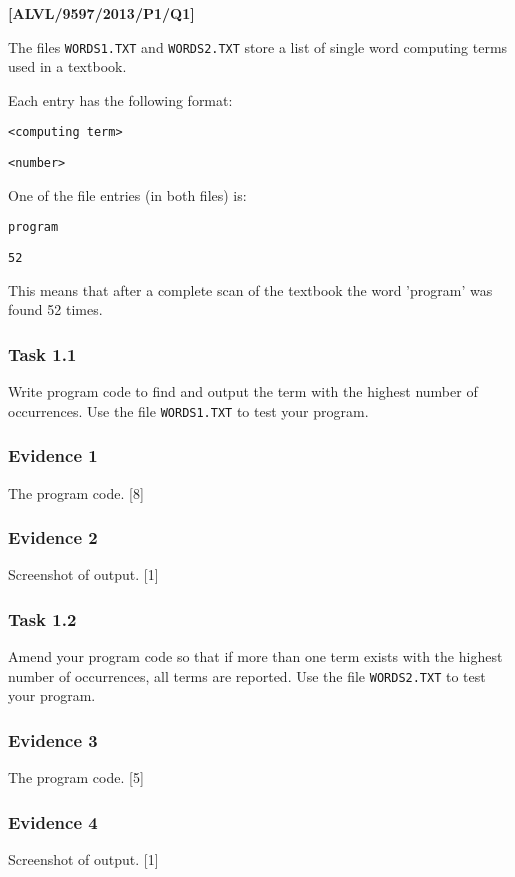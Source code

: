 \item \textbf{{[}ALVL/9597/2013/P1/Q1{]} }

The files \texttt{WORDS1.TXT} and \texttt{WORDS2.TXT} store a list
of single word computing terms used in a textbook.

Each entry has the following format: 

\texttt{<computing term>}

\texttt{<number>}

One of the file entries (in both files) is:

\texttt{program }

\texttt{52}

This means that after a complete scan of the textbook the word 'program'
was found 52 times.

\subsubsection*{Task 1.1}

Write program code to find and output the term with the highest number
of occurrences. Use the file \texttt{WORDS1.TXT} to test your program.

\subsubsection*{Evidence 1}

The program code. \hfill{}{[}8{]}

\subsubsection*{Evidence 2}

Screenshot of output. \hfill{}{[}1{]}

\subsubsection*{Task 1.2}

Amend your program code so that if more than one term exists with
the highest number of occurrences, all terms are reported. Use the
file \texttt{WORDS2.TXT} to test your program.

\subsubsection*{Evidence 3}

The program code. \hfill{}{[}5{]}

\subsubsection*{Evidence 4}

Screenshot of output.\hfill{} {[}1{]}